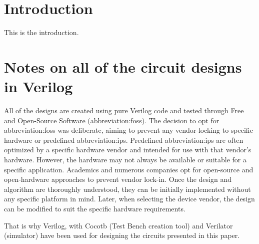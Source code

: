 \documentclass[a4paper, twoside, 11pt]{article}
\begin{document}


\tableofcontents
\newpage%
\flushbottom %
\newpage
\vspace{0pt}
\listoffigures %
\flushbottom %
\newpage
\listoftables
\flushbottom
\newpage


\null\newpage
\setcounter{page}{1}

\section{Introduction}
This is the introduction.

\flushbottom %
\newpage

\section{Notes on all of the circuit designs in Verilog}
    All of the designs are created using pure Verilog code and tested through Free and Open-Source Software (\gls{abbreviation:foss}). The decision to opt for \gls{abbreviation:foss}  was deliberate, aiming to prevent any vendor-locking to specific hardware or predefined \gls{abbreviation:ip}s. Predefined \gls{abbreviation:ip}s  are often optimized by a specific hardware vendor and intended for use with that vendor's hardware. However, the hardware may not always be available or suitable for a specific application. Academics and numerous companies opt for open-source and open-hardware approaches to prevent vendor lock-in. Once the design and algorithm are thoroughly understood, they can be initially implemented without any specific platform in mind. Later, when selecting the device vendor, the design can be modified to suit the specific hardware requirements.\par
    That is why Verilog, with Cocotb \cite{cocotb} (Test Bench creation tool) and Verilator \cite{verilator} (simulator) have been used for designing the circuits presented in this paper.\par
\end{document}
